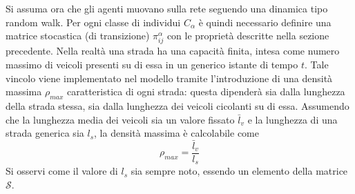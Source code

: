 \documentclass[../main.tex]{subfiles}
\begin{document}
Si assuma ora che gli agenti muovano sulla rete seguendo una dinamica tipo random walk.
Per ogni classe di individui $C_{\alpha}$ \`e quindi necessario definire una matrice stocastica (di transizione) $\pi_{ij}^{\alpha}$ con le propriet\`a descritte nella sezione precedente.
Nella realt\`a una strada ha una capacit\`a finita, intesa come numero massimo di veicoli presenti su di essa in un generico istante di tempo $t$.
Tale vincolo viene implementato nel modello tramite l'introduzione di una densit\`a massima $\rho_{max}$ caratteristica di ogni strada: questa dipender\`a sia dalla lunghezza della strada stessa, sia dalla lunghezza dei veicoli cicolanti su di essa.
Assumendo che la lunghezza media dei veicoli sia un valore fissato $\bar{l}_v$ e la lunghezza di una strada generica sia $l_s$, la densit\`a massima \`e calcolabile come
\begin{equation}
    \rho_{max}=\frac{\bar{l}_v}{l_s}
    \label{eq:density}
\end{equation}
Si osservi come il valore di $l_s$ sia sempre noto, essendo un elemento della matrice $\mathcal{S}$.
\end{document}
